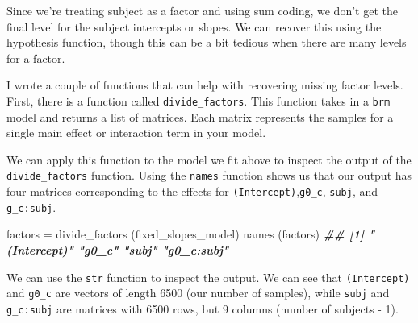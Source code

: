 \documentclass[
]{book}
\newenvironment{Shaded}{\begin{snugshade}}{\end{snugshade}}
\newcommand{\DocumentationTok}[1]{\textcolor[rgb]{0.56,0.35,0.01}{\textbf{\textit{#1}}}}
\newcommand{\FunctionTok}[1]{\textcolor[rgb]{0.00,0.00,0.00}{#1}}
\newcommand{\NormalTok}[1]{#1}
\newcommand{\OtherTok}[1]{\textcolor[rgb]{0.56,0.35,0.01}{#1}}
\begin{document}
Since we're treating subject as a factor and using sum coding, we don't get the final level for the subject intercepts or slopes. We can recover this using the hypothesis function, though this can be a bit tedious when there are many levels for a factor.

I wrote a couple of functions that can help with recovering missing factor levels. First, there is a function called \texttt{divide\_factors}. This function takes in a \texttt{brm} model and returns a list of matrices. Each matrix represents the samples for a single main effect or interaction term in your model.

We can apply this function to the model we fit above to inspect the output of the \texttt{divide\_factors} function. Using the \texttt{names} function shows us that our output has four matrices corresponding to the effects for \texttt{(Intercept)},\texttt{g0\_c}, \texttt{subj}, and \texttt{g\_c:subj}.

\begin{Shaded}
\begin{Highlighting}[]
\NormalTok{factors }\OtherTok{=} \FunctionTok{divide\_factors}\NormalTok{ (fixed\_slopes\_model)}
\FunctionTok{names}\NormalTok{ (factors)}
\DocumentationTok{\#\# [1] "(Intercept)" "g0\_c"        "subj"        "g0\_c:subj"}
\end{Highlighting}
\end{Shaded}

We can use the \texttt{str} function to inspect the output. We can see that \texttt{(Intercept)} and \texttt{g0\_c} are vectors of length 6500 (our number of samples), while \texttt{subj} and \texttt{g\_c:subj} are matrices with 6500 rows, but 9 columns (number of subjects - 1).

\begin{Shaded}
\end{Shaded}
\end{document}
